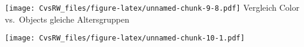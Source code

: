 \documentclass[
]{article}
\newenvironment{Shaded}{\begin{snugshade}}{\end{snugshade}}
\newcommand{\DataTypeTok}[1]{\textcolor[rgb]{0.13,0.29,0.53}{#1}}
\newcommand{\FloatTok}[1]{\textcolor[rgb]{0.00,0.00,0.81}{#1}}
\newcommand{\KeywordTok}[1]{\textcolor[rgb]{0.13,0.29,0.53}{\textbf{#1}}}
\newcommand{\NormalTok}[1]{#1}
\newcommand{\OperatorTok}[1]{\textcolor[rgb]{0.81,0.36,0.00}{\textbf{#1}}}
\newcommand{\StringTok}[1]{\textcolor[rgb]{0.31,0.60,0.02}{#1}}
\begin{document}
\begin{Shaded}
\end{Shaded}

\texttt{[image: CvsRW\_files/figure-latex/unnamed-chunk-9-8.pdf]}
Vergleich Color vs.~Objects gleiche Altersgruppen

\begin{Shaded}
\end{Shaded}

\texttt{[image: CvsRW\_files/figure-latex/unnamed-chunk-10-1.pdf]}
\end{document}
